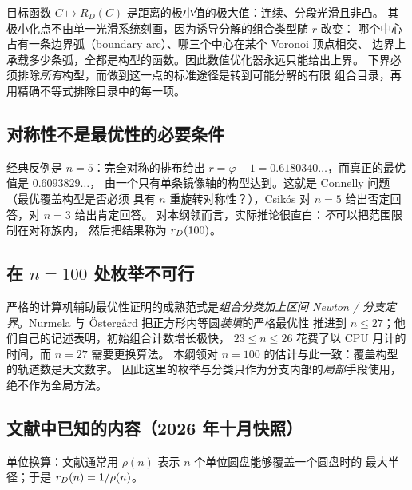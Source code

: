 目标函数 $C\mapsto R_D(C)$ 是距离的极小值的极大值：连续、分段光滑且非凸。
其极小化点不由单一光滑系统刻画，因为诱导分解的组合类型随 $r$ 改变：
哪个中心占有一条边界弧（boundary arc）、哪三个中心在某个 Voronoi 顶点相交、
边界上承载多少条弧，全都是构型的函数。因此数值优化器永远只能给出上界。
下界必须排除\emph{所有}构型，而做到这一点的标准途径是转到可能分解的有限
组合目录，再用精确不等式排除目录中的每一项。

\subsection{对称性不是最优性的必要条件}

经典反例是 $n=5$：完全对称的排布给出
$r=\varphi-1=0.6180340\ldots$，而真正的最优值是 $0.6093829\ldots$，
由一个只有单条镜像轴的构型达到。这就是 Connelly 问题（最优覆盖构型是否必须
具有 $n$ 重旋转对称性？），Csik\'os 对 $n=5$ 给出否定回答，对 $n=3$ 给出肯定回答。
对本纲领而言，实际推论很直白：\emph{不}可以把范围限制在对称族内，
然后把结果称为 $r_{D}(100)$。

\subsection{在 $n=100$ 处枚举不可行}

严格的计算机辅助最优性证明的成熟范式是\emph{组合分类加上区间 Newton /
分支定界}。Nurmela 与 \"Osterg{\aa}rd 把正方形内等圆\emph{装填}的严格最优性
推进到 $n\le27$；他们自己的记述表明，初始组合计数增长极快，
$23\le n\le26$ 花费了以 CPU 月计的时间，而 $n=27$ 需要更换算法。
本纲领对 $n=100$ 的估计与此一致：覆盖构型的轨道数是天文数字。
因此这里的枚举与分类只作为分支内部的\emph{局部}手段使用，绝不作为全局方法。

\subsection{文献中已知的内容（2026 年十月快照）}

单位换算：文献通常用 $\rho(n)$ 表示 $n$ 个单位圆盘能够覆盖一个圆盘时的
最大半径；于是 $r_{D}(n)=1/\rho(n)$。

